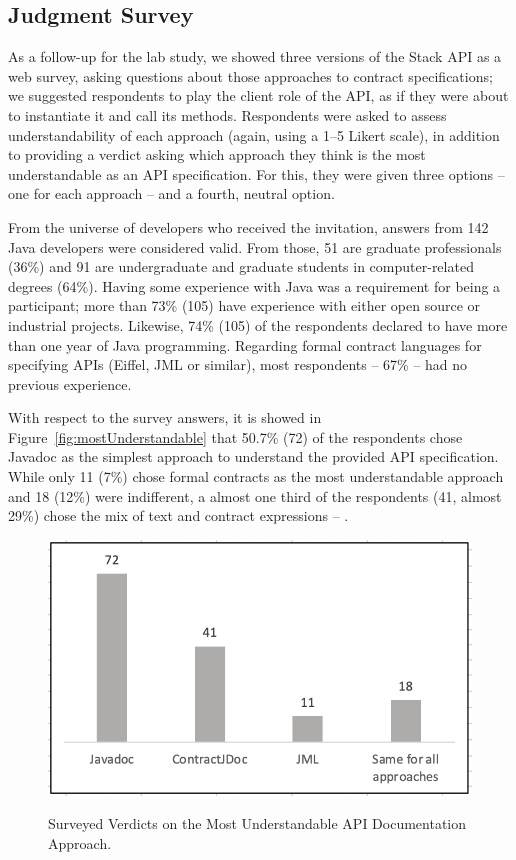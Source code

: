 \subsection{Judgment Survey}
\label{sec:surveyResults}

As a follow-up for the lab study, we showed three versions of the Stack API as a web survey, asking questions about those approaches to contract specifications; we suggested respondents to play the client role of the API, as if they were about to instantiate it and call its methods.
Respondents were asked to assess understandability of each approach (again, using a 1--5 Likert scale), in addition to providing a verdict asking which approach they think is the most understandable as an API specification. For this, they were given three options -- one for each approach -- and a fourth, neutral option.

From the universe of developers who received the invitation, answers from 142 Java developers were considered valid.
From those, 51 are graduate professionals (36\%) and 91 are undergraduate and graduate students in computer-related degrees (64\%).
Having some experience with Java was a requirement for being a participant; more than 73\% (105) have experience with either open source or industrial projects. Likewise, 74\% (105) of the respondents declared to have more than one year of Java programming.
Regarding formal contract languages for specifying APIs (Eiffel, JML or similar), most respondents -- 67\% -- had no previous experience. 


With respect to the survey answers, it is showed in Figure~\ref{fig:mostUnderstandable} that 50.7\% (72) of the respondents chose Javadoc as the simplest approach to understand the provided API specification. 
While only 11 (7\%) chose formal contracts as the most understandable approach and 18 (12\%) were indifferent, a almost one third of the respondents (41, almost 29\%) chose the mix of text and contract expressions -- \contractjdoc{}.


\begin{figure}
\centering
\includegraphics[width=0.7\linewidth]{figs/mostUnderstandable.png}
\label{fig:mostUnderstandable}
\caption{Surveyed Verdicts on the Most Understandable API Documentation Approach.}
\label{fig:surveyResults}
\end{figure}



